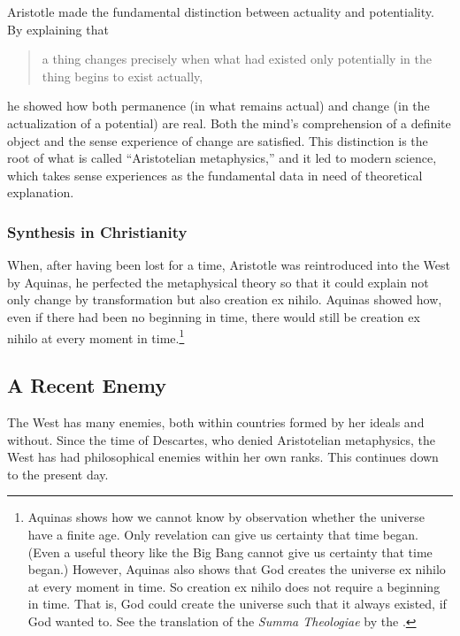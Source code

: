 \documentclass[twocolumn]{article}
\begin{document}
Aristotle made the fundamental distinction between actuality and potentiality.
By explaining that
\begin{quote}
   a thing changes precisely when what had existed only potentially in the
   thing begins to exist actually,
\end{quote}
he showed how both permanence (in what remains actual) and change (in the
actualization of a potential) are real. Both the mind's comprehension of a
definite object and the sense experience of change are satisfied.  This
distinction is the root of what is called ``Aristotelian metaphysics,'' and it
led to modern science, which takes sense experiences as the fundamental data in
need of theoretical explanation.

\subsubsection{Synthesis in Christianity}

When, after having been lost for a time, Aristotle was reintroduced into the
West by Aquinas, he perfected the metaphysical theory so that it could explain
not only change by transformation but also creation ex nihilo.  Aquinas showed
how, even if there had been no beginning in time, there would still be creation
ex nihilo at every moment in time.\footnote{%
   Aquinas shows how we cannot know by observation whether the universe have a
   finite age.  Only revelation can give us certainty that time began.  (Even a
   useful theory like the Big Bang cannot give us certainty that time began.)
   However, Aquinas also shows that God creates the universe ex nihilo at every
   moment in time.  So creation ex nihilo does not require a beginning in time.
   That is, God could create the universe such that it always existed, if God
   wanted to.  See the translation of the {\it Summa Theologiae} by the
   \citet[I, Q45, A1, and I, Q46, A1]{e1920}.
}

\subsection{A Recent Enemy}

The West has many enemies, both within countries formed by her ideals and
without.  Since the time of Descartes, who denied Aristotelian metaphysics, the
West has had philosophical enemies within her own ranks.  This continues down
to the present day.
\end{document}
